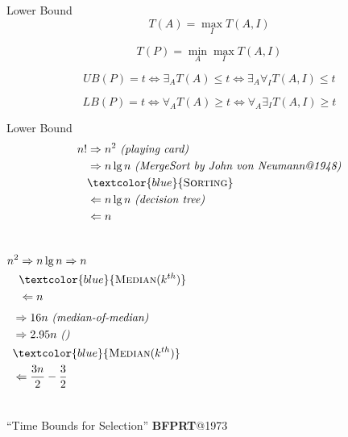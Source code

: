\documentclass{beamer}
\begin{document}
\begin{frame}{Lower Bound}
  \[ T(A) = \max_{I} T(A,I) \]

  \[ T(P) = \min_{A} \max_{I} T(A,I) \]

  \[
    UB(P) = t \iff \exists_{A} T(A) \le t \iff \exists_{A} \forall_{I} T(A, I)
    \le t
  \]

  \[
    LB(P) = t \iff \forall_{A} T(A) \geq t \iff \forall_{A} \exists_{I} T(A, I)
    \geq t
  \]
\end{frame}
\begin{frame}{Lower Bound}
  \begin{align*}
    n! & \Rightarrow n^2 \textrm{ \it (playing card)} \\
       & \Rightarrow n \lg n \textrm{ \it (MergeSort by John von Neumann@1948)}
       \\
       & \textcolor{blue}{\textrm{\textsc{Sorting}}} \\
       & \Leftarrow n \lg n \textrm{ \it (decision tree)} \\
       & \Leftarrow n
  \end{align*}

  \begin{columns}
	  \begin{align*}
	    n^2 & \Rightarrow n \lg n \Rightarrow n \\
	        & \textcolor{blue}{\textsc{Median} (k^{th})} \\
	        & \Leftarrow n
	  \end{align*}
	  \begin{align*}
	    & \Rightarrow 16n \textrm{ \it (median-of-median)} \\
	    & \Rightarrow 2.95n \textrm{ \it ()}  \\
	    & \textcolor{blue}{\textsc{Median} (k^{th})} \\
	    & \Leftarrow \frac{3n}{2} - \frac{3}{2}
	  \end{align*}
  \end{columns}

  \begin{center}
    ``Time Bounds for Selection'' \textbf{BFPRT}@1973
  \end{center}
\end{frame}
\end{document}
